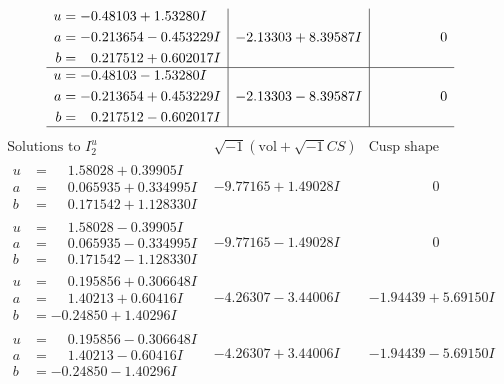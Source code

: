 \documentclass[1p]{elsarticle_modified}
\theoremstyle{definition}
\newcommand{\I}{\sqrt{-1}}
\begin{document}
$$\begin{array}{c|c|c}
\begin{aligned}
u &= -0.48103 + 1.53280 I \\
a &= -0.213654 - 0.453229 I \\
b &= \phantom{-}0.217512 + 0.602017 I\end{aligned}
 & -2.13303 + 8.39587 I & \phantom{-0.000000 } 0 \\ \hline\begin{aligned}
u &= -0.48103 - 1.53280 I \\
a &= -0.213654 + 0.453229 I \\
b &= \phantom{-}0.217512 - 0.602017 I\end{aligned}
 & -2.13303 - 8.39587 I & \phantom{-0.000000 } 0\\
 \hline 
 \end{array}$$\newpage$$\begin{array}{c|c|c}  
\text{Solutions to }I^u_{2}& \I (\text{vol} + \sqrt{-1}CS) & \text{Cusp shape}\\
 \hline 
\begin{aligned}
u &= \phantom{-}1.58028 + 0.39905 I \\
a &= \phantom{-}0.065935 + 0.334995 I \\
b &= \phantom{-}0.171542 + 1.128330 I\end{aligned}
 & -9.77165 + 1.49028 I & \phantom{-0.000000 } 0 \\ \hline\begin{aligned}
u &= \phantom{-}1.58028 - 0.39905 I \\
a &= \phantom{-}0.065935 - 0.334995 I \\
b &= \phantom{-}0.171542 - 1.128330 I\end{aligned}
 & -9.77165 - 1.49028 I & \phantom{-0.000000 } 0 \\ \hline\begin{aligned}
u &= \phantom{-}0.195856 + 0.306648 I \\
a &= \phantom{-}1.40213 + 0.60416 I \\
b &= -0.24850 + 1.40296 I\end{aligned}
 & -4.26307 - 3.44006 I & -1.94439 + 5.69150 I \\ \hline\begin{aligned}
u &= \phantom{-}0.195856 - 0.306648 I \\
a &= \phantom{-}1.40213 - 0.60416 I \\
b &= -0.24850 - 1.40296 I\end{aligned}
 & -4.26307 + 3.44006 I & -1.94439 - 5.69150 I \\ \hline\begin{aligned}

\end{aligned}
\end{array}$$
\end{document}
